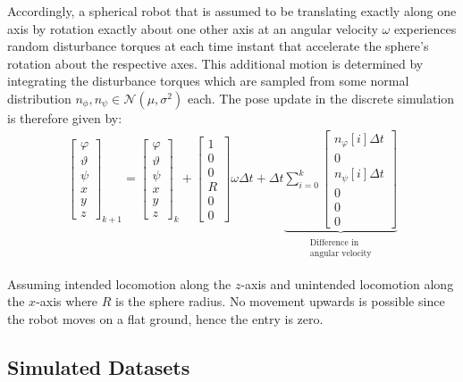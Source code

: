 Accordingly, a spherical robot that is assumed to be translating exactly along one axis by rotation exactly about one other axis at an angular velocity $\omega$  experiences random disturbance torques at each time instant that accelerate the sphere's rotation about the respective axes. 
This additional motion is determined by integrating the disturbance torques which are sampled from some normal distribution $n_\phi, n_\psi \in \mathcal{N}(\mu,\sigma^2)$ each.  
The pose update in the discrete simulation is therefore given by: 
\begin{align}
	\begin{bmatrix}\varphi\\\vartheta\\\psi\\x\\y\\z\end{bmatrix}_{k+1} = 
	\begin{bmatrix}\varphi\\\vartheta\\\psi\\x\\y\\z\end{bmatrix}_{k} 
	+ \begin{bmatrix}1\\0\\0\\R\\0\\0\end{bmatrix}\omega \Delta t  + \Delta t \underbrace{\sum_{i = 0}^k \begin{bmatrix}n_\varphi[i] \Delta t\\0\\n_\psi[i]\Delta t\\0\\0\\0\end{bmatrix}}_{\substack{\text{Difference in}\\\text{angular velocity}}}
\end{align}

Assuming intended locomotion along the $z$-axis and unintended locomotion along the $x$-axis where $R$ is the sphere radius.
No movement upwards is possible since the robot moves on a flat ground, hence the entry is zero.

\subsection{Simulated Datasets}


